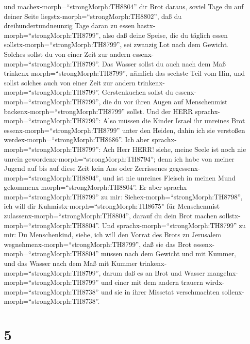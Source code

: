 und machex-morph=``strongMorph:TH8804'' dir Brot daraus, soviel Tage du
auf deiner Seite liegstx-morph=``strongMorph:TH8802'', daß du
dreihundertundneunzig Tage daran zu essen
hastx-morph=``strongMorph:TH8799'',  also daß deine Speise,
die du täglich essen sollstx-morph=``strongMorph:TH8799'', sei zwanzig
Lot nach dem Gewicht. Solches sollst du von einer Zeit zur andern
essenx-morph=``strongMorph:TH8799''.  Das Wasser sollst du
auch nach dem Maß trinkenx-morph=``strongMorph:TH8799'', nämlich das
sechste Teil vom Hin, und sollst solches auch von einer Zeit zur andern
trinkenx-morph=``strongMorph:TH8799''.  Gerstenkuchen
sollst du essenx-morph=``strongMorph:TH8799'', die du vor ihren Augen
auf Menschenmist backenx-morph=``strongMorph:TH8799'' sollst.
 Und der HERR sprachx-morph=``strongMorph:TH8799'': Also
müssen die Kinder Israel ihr unreines Brot
essenx-morph=``strongMorph:TH8799'' unter den Heiden, dahin ich sie
verstoßen werdex-morph=``strongMorph:TH8686''.  Ich aber
sprachx-morph=``strongMorph:TH8799'': Ach Herr HERR! siehe, meine Seele
ist noch nie unrein gewordenx-morph=``strongMorph:TH8794''; denn ich
habe von meiner Jugend auf bis auf diese Zeit kein Aas oder Zerrissenes
gegessenx-morph=``strongMorph:TH8804'', und ist nie unreines Fleisch in
meinen Mund gekommenx-morph=``strongMorph:TH8804''.  Er
aber sprachx-morph=``strongMorph:TH8799'' zu mir:
Siehex-morph=``strongMorph:TH8798'', ich will dir
Kuhmistx-morph=``strongMorph:TH8675'' für Menschenmist
zulassenx-morph=``strongMorph:TH8804'', darauf du dein Brot machen
sollstx-morph=``strongMorph:TH8804''.  Und
sprachx-morph=``strongMorph:TH8799'' zu mir: Du Menschenkind, siehe, ich
will den Vorrat des Brots zu Jerusalem
wegnehmenx-morph=``strongMorph:TH8799'', daß sie das Brot
essenx-morph=``strongMorph:TH8804'' müssen nach dem Gewicht und mit
Kummer, und das Wasser nach dem Maß mit Kummer
trinkenx-morph=``strongMorph:TH8799'',  darum daß es an
Brot und Wasser mangelnx-morph=``strongMorph:TH8799'' und einer mit dem
andern trauern wirdx-morph=``strongMorph:TH8738'' und sie in ihrer
Missetat verschmachten sollenx-morph=``strongMorph:TH8738''.

\hypertarget{section-4}{%
\section{5}\label{section-4}}

